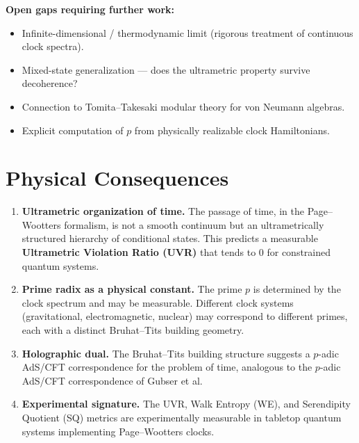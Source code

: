 \documentclass[12pt,a4paper]{article}
\begin{document}
\textbf{Open gaps requiring further work:}
\begin{itemize}[nosep]
\item Infinite-dimensional / thermodynamic limit (rigorous treatment of continuous clock spectra).
\item Mixed-state generalization --- does the ultrametric property survive decoherence?
\item Connection to Tomita--Takesaki modular theory for von Neumann algebras.
\item Explicit computation of $p$ from physically realizable clock Hamiltonians.
\end{itemize}

\section{Physical Consequences}

\begin{enumerate}[label=\textbf{C\arabic*:},leftmargin=*]

\item \textbf{Ultrametric organization of time.} The passage of time, in the Page--Wootters formalism, is not a smooth continuum but an ultrametrically structured hierarchy of conditional states. This predicts a measurable \textbf{Ultrametric Violation Ratio (UVR)} that tends to 0 for constrained quantum systems.

\item \textbf{Prime radix as a physical constant.} The prime $p$ is determined by the clock spectrum and may be measurable. Different clock systems (gravitational, electromagnetic, nuclear) may correspond to different primes, each with a distinct Bruhat--Tits building geometry.

\item \textbf{Holographic dual.} The Bruhat--Tits building structure suggests a $p$-adic AdS/CFT correspondence for the problem of time, analogous to the $p$-adic AdS/CFT correspondence of Gubser et al.

\item \textbf{Experimental signature.} The UVR, Walk Entropy (WE), and Serendipity Quotient (SQ) metrics are experimentally measurable in tabletop quantum systems implementing Page--Wootters clocks.

\end{enumerate}
\end{document}
